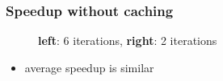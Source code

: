 \documentclass{beamer}
\begin{document}
\begin{frame}
  \frametitle{Speedup without caching}
  \begin{figure}
    \centering
      \caption{\textbf{left}: 6 iterations, \textbf{right}: 2 iterations}
  \end{figure}
  
  \begin{itemize}
    \item average speedup is similar
  \end{itemize}
\end{frame}
\end{document}
